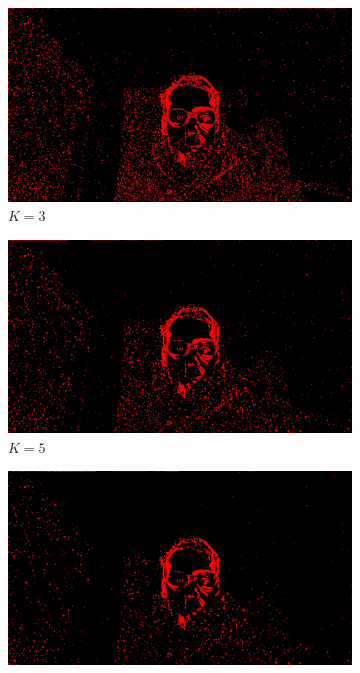 \documentclass[paper=a4, fontsize=10pt]{scrartcl}	%
\begin{document}
\begin{figure}[H]
		\begin{subfigure}{0.2\textwidth}
			\includegraphics[width=\linewidth]{images/heatmap/img_mean/img_man_red3.jpg}
			\caption{$K=3$}
		\end{subfigure}%
		\begin{subfigure}{0.2\textwidth}
			\includegraphics[width=\linewidth]{images/heatmap/img_mean/img_man_red5.jpg}
			\caption{$K=5$}
		\end{subfigure}%
		\begin{subfigure}{0.2\textwidth}
			\includegraphics[width=\linewidth]{images/heatmap/img_mean/img_man_red7.jpg}

\end{subfigure}
\end{figure}
\end{document}
